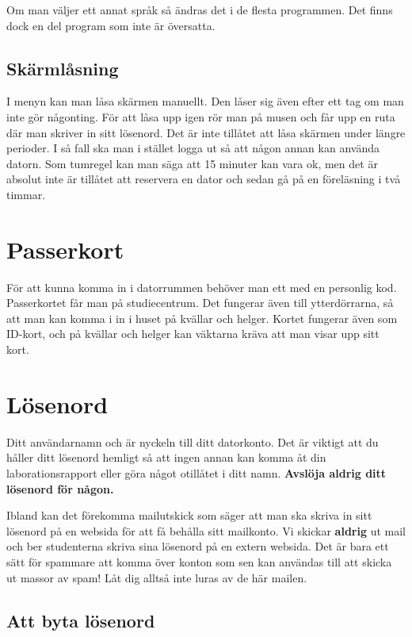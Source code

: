 \documentclass[a4paper,twocolumn]{book}
\begin{document}
Om man väljer ett annat språk så ändras det i de flesta programmen. Det finns
dock en del program som inte är översatta.

\subsection{Skärmlåsning}

I menyn kan man låsa skärmen manuellt. Den låser sig även efter
ett tag om man inte gör någonting. För att låsa upp igen rör man på musen och
får upp en ruta där man skriver in sitt lösenord. Det är inte tillåtet att
låsa skärmen under längre perioder. I så fall ska man i stället logga ut så
att någon annan kan använda datorn. Som tumregel kan man säga att 15
minuter kan vara ok, men det är absolut inte är tillåtet att reservera en
dator och sedan gå på en föreläsning i två timmar.

\section{Passerkort}

För att kunna komma in i datorrummen behöver man ett
 med en personlig kod. Passerkortet får man på studiecentrum.
Det fungerar även till ytterdörrarna, så att man kan komma i in i huset på
kvällar och helger. Kortet fungerar även som ID-kort, och på kvällar och
helger kan väktarna kräva att man visar upp sitt kort. 

\section{Lösenord}

Ditt användarnamn och  är nyckeln till ditt
datorkonto. Det är viktigt att du håller ditt lösenord hemligt så att
ingen annan kan komma åt din laborationsrapport eller göra något
otillåtet i ditt namn. \textbf{Avslöja aldrig ditt lösenord för någon.}

Ibland kan det förekomma mailutskick som säger att man ska skriva in sitt
lösenord på en websida för att få behålla sitt mailkonto.  Vi skickar
\textbf{aldrig} ut mail och ber studenterna skriva sina lösenord på en extern
websida. Det är bara ett sätt för spammare att komma över konton som sen
kan användas till att skicka ut massor av spam! Låt dig alltså inte luras av de
här mailen.

\subsection{Att byta lösenord}
\end{document}
